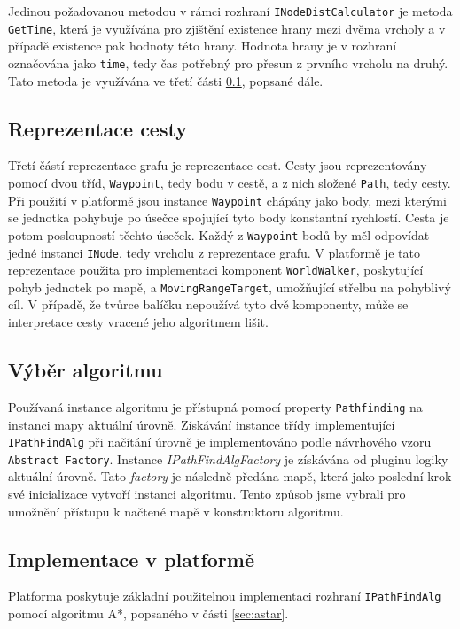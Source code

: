 Jedinou požadovanou metodou v rámci rozhraní \texttt{INodeDistCalculator} je metoda \texttt{GetTime}, která je využívána pro zjištění existence hrany mezi dvěma vrcholy a v případě existence pak hodnoty této hrany. Hodnota hrany je v rozhraní označována jako \texttt{time}, tedy čas potřebný pro přesun z prvního vrcholu na druhý. Tato metoda je využívána ve třetí části \ref{sec:path}, popsané dále.

\subsection{Reprezentace cesty}
\label{sec:path}
Třetí částí reprezentace grafu je reprezentace cest. Cesty jsou reprezentovány pomocí dvou tříd, \texttt{Waypoint}, tedy bodu v cestě, a z nich složené \texttt{Path}, tedy cesty. Při použití v platformě jsou instance \texttt{Waypoint} chápány jako body, mezi kterými se jednotka pohybuje po úsečce spojující tyto body konstantní rychlostí. Cesta je potom posloupností těchto úseček. Každý z \texttt{Waypoint} bodů by měl odpovídat jedné instanci \texttt{INode}, tedy vrcholu z reprezentace grafu. V platformě je tato reprezentace použita pro implementaci komponent \texttt{WorldWalker}, poskytující pohyb jednotek po mapě, a \texttt{MovingRangeTarget}, umožňující střelbu na pohyblivý cíl. V případě, že tvůrce balíčku nepoužívá tyto dvě komponenty, může se interpretace cesty vracené jeho algoritmem lišit.


\subsection{Výběr algoritmu}
\label{sec:pathfindselection}
Používaná instance algoritmu je přístupná pomocí property \texttt{Pathfinding} na instanci mapy aktuální úrovně. Získávání instance třídy implementující \texttt{IPathFindAlg} při načítání úrovně je implementováno podle návrhového vzoru \texttt{Abstract Factory}. Instance \textit{IPathFindAlgFactory} je získávána od pluginu logiky aktuální úrovně. Tato \textit{factory} je následně předána mapě, která jako poslední krok své inicializace vytvoří instanci algoritmu. Tento způsob jsme vybrali pro umožnění přístupu k načtené mapě v konstruktoru algoritmu.

\subsection{Implementace v platformě}
Platforma poskytuje základní použitelnou implementaci rozhraní \texttt{IPathFindAlg} pomocí algoritmu A*, popsaného v části \ref{sec:astar}. 

